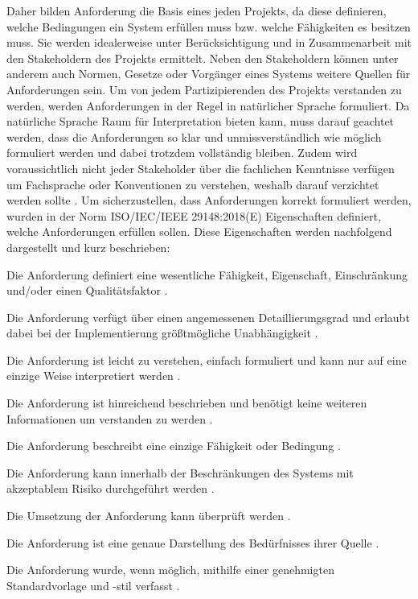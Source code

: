 Daher bilden Anforderung die Basis eines jeden Projekts, da diese definieren, welche Bedingungen ein System erfüllen muss bzw. welche Fähigkeiten 
es besitzen muss. Sie werden idealerweise unter Berücksichtigung und in Zusammenarbeit mit den Stakeholdern des Projekts ermittelt. Neben den 
Stakeholdern können unter anderem auch Normen, Gesetze oder Vorgänger eines Systems weitere Quellen für Anforderungen sein. Um von jedem 
Partizipierenden des Projekts verstanden zu werden, werden Anforderungen in der Regel in natürlicher Sprache formuliert. Da natürliche Sprache Raum für 
Interpretation bieten kann, muss darauf geachtet werden, dass die Anforderungen so klar und unmissverständlich wie möglich formuliert werden und dabei 
trotzdem vollständig bleiben. Zudem wird voraussichtlich nicht jeder Stakeholder über die fachlichen Kenntnisse verfügen um Fachsprache oder 
Konventionen zu verstehen, weshalb darauf verzichtet werden sollte \cite[vgl. S.2]{DOORS}. Um sicherzustellen, dass Anforderungen korrekt 
formuliert werden, wurden in der Norm ISO/IEC/IEEE 29148:2018(E) Eigenschaften definiert, welche Anforderungen erfüllen sollen. 
Diese Eigenschaften werden nachfolgend dargestellt und kurz beschrieben:

\begin{description}[style=multiline,leftmargin=3cm,font=\bfseries, nolistsep]
    \item[Notwendig] Die Anforderung definiert eine wesentliche Fähigkeit, Eigenschaft, Einschränkung und/oder einen Qualitätsfaktor \cite[vgl. S.12]{RE-ISO}.
    \item[Angemessen] Die Anforderung verfügt über einen angemessenen Detaillierungsgrad und erlaubt dabei bei der Implementierung größtmögliche Unabhängigkeit \cite[vgl. S.12]{RE-ISO}.
    \item[Eindeutig] Die Anforderung ist leicht zu verstehen, einfach formuliert und kann nur auf eine einzige Weise interpretiert werden \cite[vgl. S.12]{RE-ISO}.
    \item[Komplett] Die Anforderung ist hinreichend beschrieben und benötigt keine weiteren Informationen um verstanden zu werden \cite[vgl. S.12]{RE-ISO}.
    \item[Atomar] Die Anforderung beschreibt eine einzige Fähigkeit oder Bedingung \cite[vgl. S.12]{RE-ISO}.
    \item[Durchführbar] Die Anforderung kann innerhalb der Beschränkungen des Systems mit akzeptablem Risiko durchgeführt werden \cite[vgl. S.13]{RE-ISO}.
    \item[Verifizierbar] Die Umsetzung der Anforderung kann überprüft werden \cite[vgl. S.13]{RE-ISO}.
    \item[Korrekt] Die Anforderung ist eine genaue Darstellung des Bedürfnisses ihrer Quelle \cite[vgl. S.13]{RE-ISO}.
    \item[Konform] Die Anforderung wurde, wenn möglich, mithilfe einer genehmigten Standardvorlage und -stil verfasst \cite[vgl. S.13]{RE-ISO}.
\end{description}

